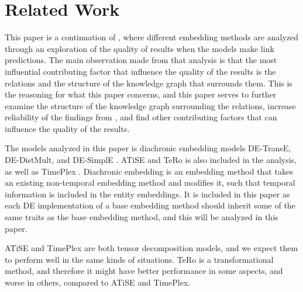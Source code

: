 \section{Related Work}
\label{sec:related-work}

This paper is a continuation of \cite{P9}, where different embedding methods are analyzed through an exploration of the quality of results when the models make link predictions. The main observation made from that analysis is that the most influential contributing factor that influence the quality of the results is the relations and the structure of the knowledge graph that surrounds them. This is the reasoning for what this paper concerns, and this paper serves to further examine the structure of the knowledge graph surrounding the relations, increase reliability of the findings from \cite{P9}, and find other contributing factors that can influence the quality of the results.

The models analyzed in this paper is diachronic embedding models DE-TransE, DE-DistMult, and DE-SimplE \cite{goel19diachronicemb}. ATiSE \cite{xu19atise} and TeRo \cite{xu2020tero} is also included in the analysis, as well as TimePlex \cite{jain2020timeplex}. 
Diachronic embedding is an embedding method that takes an existing non-temporal embedding method and modifies it, such that temporal information is included in the entity embeddings. It is included in this paper as each DE implementation of a base embedding method should inherit some of the same traits as the base embedding method, and this will be analyzed in this paper.

ATiSE and TimePlex are both tensor decomposition models, and we expect them to perform well in the same kinds of situations. TeRo is a transformational method, and therefore it might have better performance in some aspects, and worse in others, compared to ATiSE and TimePlex.



